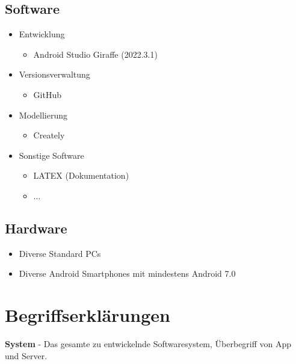 \documentclass[oneside, ngerman]{sdqtechreport}
\begin{document}
\section{Software}
\label{sec:Entwicklungsumgebung:Software}

\begin{itemize}
    \item Entwicklung
    \begin{itemize}
        \item Android Studio Giraffe (2022.3.1)
    \end{itemize}
    
    \item Versionsverwaltung
    \begin{itemize}
        \item GitHub
    \end{itemize}

    \item Modellierung
    \begin{itemize}
        \item Creately
    \end{itemize}

    \item Sonstige Software
    \begin{itemize}
        \item LATEX (Dokumentation)
        \item ...
    \end{itemize}
    
\end{itemize}

\section{Hardware}
\label{sec:Entwicklungsumgebung:Hardware}

\begin{itemize}
    \item Diverse Standard PCs
    \item Diverse Android Smartphones mit mindestens Android 7.0
\end{itemize}


\chapter{Begriffserklärungen}
\label{chap:Begriffserklärungen}

\textbf{System}
 - Das gesamte zu entwickelnde Softwaresystem, Überbegriff von App und Server.
\end{document}
